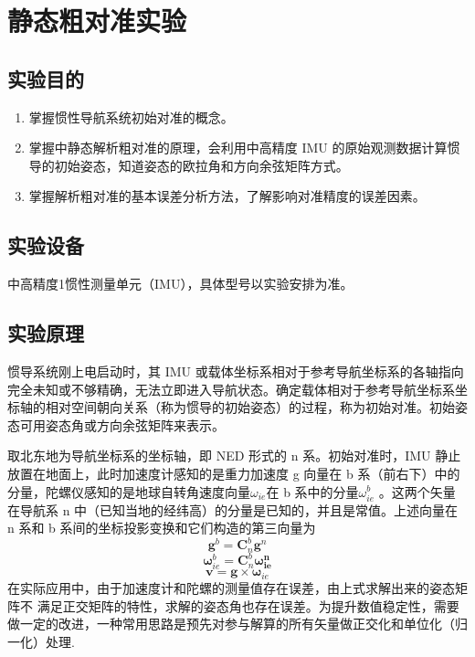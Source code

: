 \documentclass{ctexart}
\begin{document}
\section{静态粗对准实验}
\subsection{实验目的}
\begin{enumerate}[(1)]
\item 掌握惯性导航系统初始对准的概念。
\item 掌握中静态解析粗对准的原理，会利用中高精度 IMU 的原始观测数据计算惯导的初始姿态，知道姿态的欧拉角和方向余弦矩阵方式。
\item 掌握解析粗对准的基本误差分析方法，了解影响对准精度的误差因素。
\end{enumerate}
\subsection{实验设备}
中高精度1惯性测量单元（IMU），具体型号以实验安排为准。
\subsection{实验原理}
惯导系统刚上电启动时，其 IMU 或载体坐标系相对于参考导航坐标系的各轴指向完全未知或不够精确，无法立即进入导航状态。确定载体相对于参考导航坐标系坐标轴的相对空间朝向关系（称为惯导的初始姿态）的过程，称为初始对准。初始姿态可用姿态角或方向余弦矩阵来表示。

取北东地为导航坐标系的坐标轴，即 NED 形式的 n 系。初始对准时，IMU 静止放置在地面上，此时加速度计感知的是重力加速度 g 向量在 b 系（前右下）中的分量，陀螺仪感知的是地球自转角速度向量$\omega_{ie}$在 b 系中的分量$\omega^b_{ie}$ 。这两个矢量在导航系 n 中（已知当地的经纬高）的分量是已知的，并且是常值。上述向量在 n 系和 b 系间的坐标投影变换和它们构造的第三向量为
\begin{equation}
\mathbf{g}^b=\mathbf{C}^b_n\mathbf{g}^n
\end{equation}
\begin{equation}
\mathbf{\omega}^b_{ie}=\mathbf{C}^b_n\mathbf{\omega^n_{ie}}
\end{equation}
\begin{equation}
\mathbf{v}=\mathbf{g}\times\mathbf{\omega}_{ie}
\end{equation}
在实际应用中，由于加速度计和陀螺的测量值存在误差，由上式求解出来的姿态矩阵不
满足正交矩阵的特性，求解的姿态角也存在误差。为提升数值稳定性，需要做一定的改进，一种常用思路是预先对参与解算的所有矢量做正交化和单位化（归一化）处理.
\end{document}
